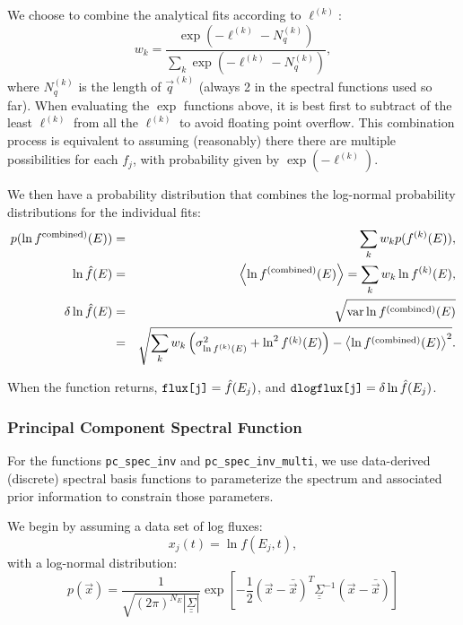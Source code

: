\documentclass{article}    %
\newcommand{\dbul}[1]{\underline{\underline{#1}}}
\newcommand{\var}{\mathop{{\rm var}}}
\begin{document}
We choose to combine the analytical fits according to $\ell^{(k)}$:
\begin{equation}
w_k = \frac{\exp(-\ell^{(k)}-N^{(k)}_q)}{\sum_k \exp(-\ell^{(k)}-N^{(k)}_q)},
\end{equation}
where $N^{(k)}_q$ is the length of $\vec{q}^{(k)}$ (always 2 in the
spectral functions used so far).  When evaluating the $\exp$ functions
above, it is best first to subtract of the least $\ell^{(k)}$ from all
the $\ell^{(k)}$ to avoid floating point overflow. This combination
process is equivalent to assuming (reasonably) there there are
multiple possibilities for each $f_j$, with probability given by
$\exp(-\ell^{(k)})$.

We then have a probability distribution that combines the log-normal
probability distributions for the individual fits:
\begin{eqnarray}
p(\ln f^{\rm combined)}(E)) &=& \sum_k w_k p(f^{(k)}(E)), \\
\ln \hat{f}(E) &=& \left<\ln f^{\rm (combined)}(E)\right> = \sum_k w_k \ln f^{(k)}(E), \\
\delta\ln\hat{f}(E) &=& \sqrt{\var \ln f^{\rm (combined)}(E)} \nonumber \\
&=& 
\sqrt{\sum_k w_k \left(\sigma^2_{\ln f^{(k)}(E)}+\ln^2f^{(k)}(E)\right) - \left<\ln f^{\rm (combined)}(E)\right>^2}.
\end{eqnarray}

When the function returns, $\verb|flux[j]| = \hat{f}(E_j)$, and $\verb|dlogflux[j]| = \delta \ln \hat{f}(E_j)$.

\subsubsection{Principal Component Spectral Function}
\label{secPCspectra}

For the functions \verb|pc_spec_inv| and \verb|pc_spec_inv_multi|, we
use data-derived (discrete) spectral basis functions to parameterize
the spectrum and associated prior information to constrain those
parameters.

We begin by assuming a data set of log fluxes:
\begin{equation}
x_{j}(t) = \ln f(E_j,t),
\end{equation}
with a log-normal distribution:
\begin{equation}
p(\vec{x}) = \frac{1}{\sqrt{(2\pi)^{N_E}|\dbul{\Sigma}|}}\exp
\left[ 
-\frac{1}{2}\left(\vec{x}-\bar{\vec{x}}\right)^{T}\dbul{\Sigma}^{-1}\left(\vec{x}-\bar{\vec{x}}\right)
\right] \label{eqPx}
\end{equation}
\end{document}
